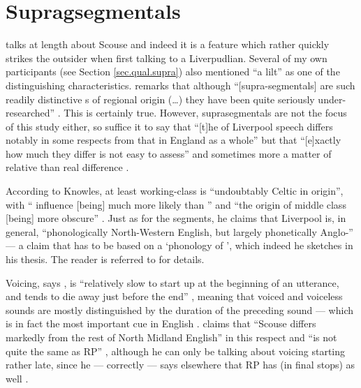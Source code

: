 	\section{Supragsegmentals}\label{sec.var.supra}

\citet{knowles1973} talks at length about Scouse  and indeed it is a feature which rather quickly strikes the outsider when first talking to a Liverpudlian.
Several of my own participants (see Section \ref{sec.qual.supra}) also mentioned ``a lilt'' as one of the distinguishing characteristics.
\citeauthor{wales2006} remarks that although ``[supra-segmentals] are such readily distinctive s of regional origin (\ldots) they have been quite seriously under-researched'' \citeyearpar[201]{wales2006}.
This is certainly true.
However, suprasegmentals are not the focus of this study either, so suffice it to say that ``[t]he  of Liverpool speech differs notably in some respects from that in England as a whole'' but that ``[e]xactly how much they differ is not easy to assess'' \citep[221]{knowles1973} and sometimes more a matter of relative  than real difference \citep[cf.][176]{knowles1973}.

According to Knowles, at least working-class  is ``undoubtably Celtic in origin'', with `` influence [being] much more likely than '' \citep[221--222]{knowles1973} and ``the origin of middle class   [being] more obscure'' \citep[222--223]{knowles1973}.
Just as for the segments, he claims that Liverpool  is, in general, ``phonologically North-Western English, but largely phonetically Anglo-'' \citep[225]{knowles1973} --- a claim that has to be based on a `phonology of ', which indeed he sketches in his thesis.
The reader is referred to \citet[174--226]{knowles1973} for details.

Voicing, says \citeauthor{knowles1973}, is ``relatively slow to start up at the beginning of an utterance, and tends to die away just before the end'' \citeyearpar[246]{knowles1973}, meaning that voiced and voiceless sounds are mostly distinguished by the duration of the preceding sound --- which is in fact the most important cue in English \citep[cf., for instance,][]{hoganrozsypal1980}. \citeauthor{knowles1973} claims that ``Scouse differs markedly from the rest of North Midland English'' in this respect and ``is not quite the same as RP'' \citeyearpar[246]{knowles1973}, although he can only be talking about voicing starting rather late, since he --- correctly --- says elsewhere that RP has  (in final stops) as well \citeyearpar[cf.][114]{knowles1973}.

